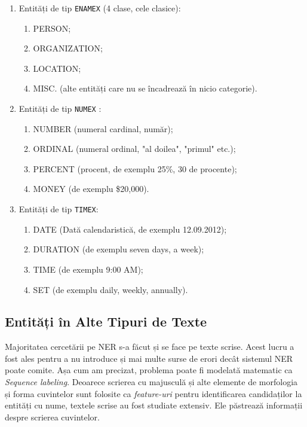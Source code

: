 \begin{enumerate}
	\item Entități de tip \texttt{ENAMEX} (4 clase, cele clasice):
	\begin{enumerate}
		\item PERSON;
		\item ORGANIZATION;
		\item LOCATION;
		\item MISC. (alte entități care nu se încadrează în nicio categorie).
	\end{enumerate}


	\item Entități de tip \texttt{NUMEX} :

	\begin{enumerate}
		\item NUMBER (numeral cardinal, număr);
		\item ORDINAL (numeral ordinal, "al doilea", "primul" etc.);
		\item PERCENT (procent, de exemplu 25\%, 30 de procente);
		\item MONEY (de exemplu \$20,000).
	\end{enumerate}
	
		\item Entități de tip \texttt{TIMEX}: 
	
		\begin{enumerate}
			\item DATE (Dată calendaristică, de exemplu 12.09.2012);
			\item DURATION (de exemplu seven days, a week);
			\item TIME (de exemplu 9:00 AM);
			\item SET (de exemplu daily, weekly, annually).
		\end{enumerate}


\end{enumerate}

\subsection{Entități în Alte Tipuri de Texte}

Majoritatea cercetării pe NER s-a făcut și se face pe texte scrise. Acest lucru a fost ales pentru a nu introduce și mai multe surse de erori decât sistemul NER poate comite. Așa cum am precizat, problema poate fi modelată matematic ca \textit{Sequence labeling}. Deoarece scrierea cu majusculă și alte elemente de morfologia și forma cuvintelor sunt folosite ca \textit{feature-uri} pentru identificarea candidaților la entități cu nume, textele scrise au fost studiate extensiv. Ele păstrează informații despre scrierea cuvintelor.


